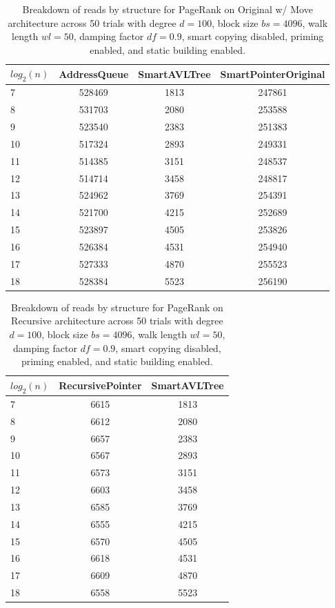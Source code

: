 \begin{table}[]
\centering
\begin{tabular}{|l|c|c|c|}
$log_2(n)$ & AddressQueue & SmartAVLTree & SmartPointerOriginal \\ \hline
7 & 528469 & 1813 & 247861 \\ \hline
8 & 531703 & 2080 & 253588 \\ \hline
9 & 523540 & 2383 & 251383 \\ \hline
10 & 517324 & 2893 & 249331 \\ \hline
11 & 514385 & 3151 & 248537 \\ \hline
12 & 514714 & 3458 & 248817 \\ \hline
13 & 524962 & 3769 & 254391 \\ \hline
14 & 521700 & 4215 & 252689 \\ \hline
15 & 523897 & 4505 & 253826 \\ \hline
16 & 526384 & 4531 & 254940 \\ \hline
17 & 527333 & 4870 & 255523 \\ \hline
18 & 528384 & 5523 & 256190 \\ \hline
\end{tabular}
\caption{Breakdown of reads by structure for PageRank on Original w/ Move architecture across 50 trials with degree $d=100$, block size $bs=4096$, walk length $wl=50$, damping factor $df=0.9$, smart copying disabled, priming enabled, and static building enabled.}
    \label{tab:reads_by_structure_pr_d100_bs4096_trials50_copiesfalse_primetrue_staticinsertiontrue_wl50_df0.9_ptoriginal_movetrue}
\end{table}

\begin{table}[]
\centering
\begin{tabular}{|l|c|c|}
$log_2(n)$ & RecursivePointer & SmartAVLTree \\ \hline
7 & 6615 & 1813 \\ \hline
8 & 6612 & 2080 \\ \hline
9 & 6657 & 2383 \\ \hline
10 & 6567 & 2893 \\ \hline
11 & 6573 & 3151 \\ \hline
12 & 6603 & 3458 \\ \hline
13 & 6585 & 3769 \\ \hline
14 & 6555 & 4215 \\ \hline
15 & 6570 & 4505 \\ \hline
16 & 6618 & 4531 \\ \hline
17 & 6609 & 4870 \\ \hline
18 & 6558 & 5523 \\ \hline
\end{tabular}
\caption{Breakdown of reads by structure for PageRank on Recursive architecture across 50 trials with degree $d=100$, block size $bs=4096$, walk length $wl=50$, damping factor $df=0.9$, smart copying disabled, priming enabled, and static building enabled.}
    \label{tab:reads_by_structure_pr_d100_bs4096_trials50_copiesfalse_primetrue_staticinsertiontrue_wl50_df0.9_ptrecursive_movetrue}
\end{table}

